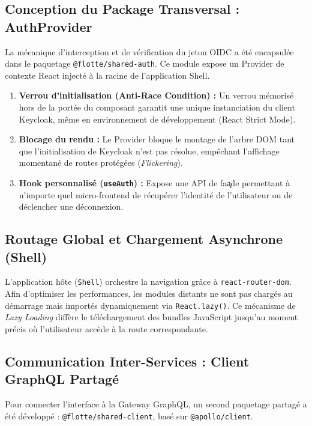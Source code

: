 \documentclass[12pt,a4paper]{article}
\begin{document}
\subsection{Conception du Package Transversal : AuthProvider}

La m\'{e}canique d'interception et de v\'{e}rification du jeton OIDC a \'{e}t\'{e} encapsul\'{e}e dans le paquetage \texttt{@flotte/shared-auth}. Ce module expose un Provider de contexte React inject\'{e} \`{a} la racine de l'application Shell.

\begin{enumerate}
  \item \textbf{Verrou d'initialisation (Anti-Race Condition) :} Un verrou m\'{e}moris\'{e} hors de la port\'{e}e du composant garantit une unique instanciation du client Keycloak, m\^{e}me en environnement de d\'{e}veloppement (React Strict Mode).
  \item \textbf{Blocage du rendu :} Le Provider bloque le montage de l'arbre DOM tant que l'initialisation de Keycloak n'est pas r\'{e}solue, emp\^{e}chant l'affichage momentan\'{e} de routes prot\'{e}g\'{e}es (\textit{Flickering}).
  \item \textbf{Hook personnalis\'{e} (\texttt{useAuth}) :} Expose une API de fa\c{a}de permettant \`{a} n'importe quel micro-frontend de r\'{e}cup\'{e}rer l'identit\'{e} de l'utilisateur ou de d\'{e}clencher une d\'{e}connexion.
\end{enumerate}

\subsection{Routage Global et Chargement Asynchrone (Shell)}

L'application h\^{o}te (\texttt{Shell}) orchestre la navigation gr\^{a}ce \`{a} \texttt{react-router-dom}. Afin d'optimiser les performances, les modules distants ne sont pas charg\'{e}s au d\'{e}marrage mais import\'{e}s dynamiquement via \texttt{React.lazy()}. Ce m\'{e}canisme de \textit{Lazy Loading} diff\`{e}re le t\'{e}l\'{e}chargement des bundles JavaScript jusqu'au moment pr\'{e}cis o\`{u} l'utilisateur acc\`{e}de \`{a} la route correspondante.

\subsection{Communication Inter-Services : Client GraphQL Partag\'{e}}

Pour connecter l'interface \`{a} la Gateway GraphQL, un second paquetage partag\'{e} a \'{e}t\'{e} d\'{e}velopp\'{e} : \texttt{@flotte/shared-client}, bas\'{e} sur \texttt{@apollo/client}.
\end{document}
